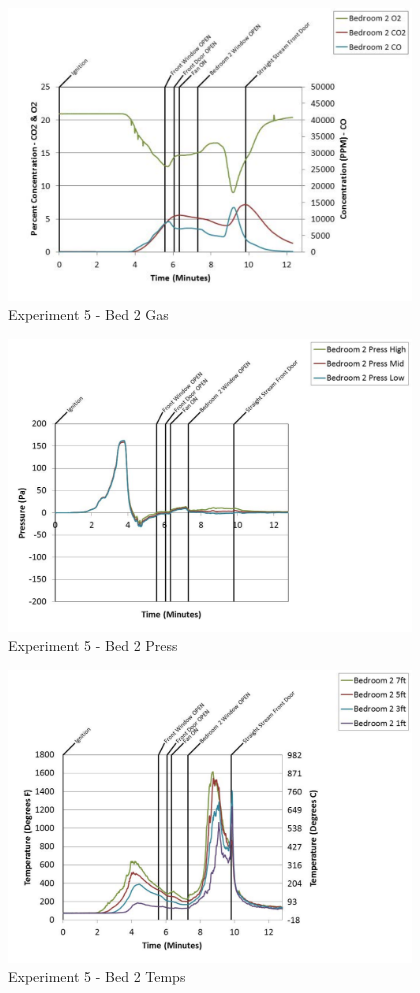 \documentclass{article}
\begin{document}
\begin{appendices}
	\clearpage

	\begin{figure}[h!]
		\centering
		\includegraphics[height=3.05in]{0_Images/Results_Charts/Exp_5_Charts/Bed2Gas.pdf}
		\caption{Experiment 5 - Bed 2 Gas}
	\end{figure}
 

	\begin{figure}[h!]
		\centering
		\includegraphics[height=3.05in]{0_Images/Results_Charts/Exp_5_Charts/Bed2Press.pdf}
		\caption{Experiment 5 - Bed 2 Press}
	\end{figure}
 
	\clearpage

	\begin{figure}[h!]
		\centering
		\includegraphics[height=3.05in]{0_Images/Results_Charts/Exp_5_Charts/Bed2Temps.pdf}
		\caption{Experiment 5 - Bed 2 Temps}
	\end{figure}
 


\end{appendices}
\end{document}
